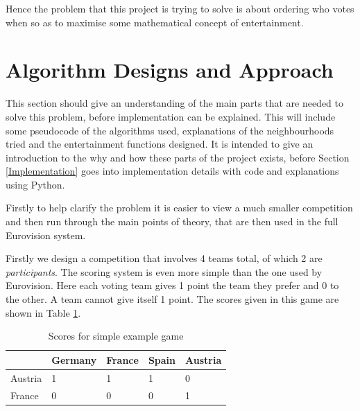 \documentclass[12pt]{report}
\begin{document}
Hence the problem that this project is trying to solve is about ordering who votes when so as to maximise some mathematical concept of entertainment.

\clearpage
\section{Algorithm Designs and Approach}\label{AlgorithmDesigns}
This section should give an understanding of the main parts that are needed to solve this problem, before implementation can be explained. This will include some pseudocode of the algorithms used, explanations of the neighbourhoods tried and the entertainment functions designed. It is intended to give an introduction to the why and how these parts of the project exists, before Section \ref{Implementation} goes into implementation details with code and explanations using Python.

Firstly to help clarify the problem it is easier to view a much smaller competition and then run through the main points of theory, that are then used in the full Eurovision system.

Firstly we design a competition that involves 4 teams total, of which 2 are \textit{participants}. The scoring system is even more simple than the one used by Eurovision. Here each voting team gives 1 point the team they prefer and 0 to the other. A team cannot give itself 1 point. The scores given in this game are shown in Table \ref{t_simpleMatrix}.

\begin{table}[H]
\centering
\caption{Scores for simple example game}
\label{t_simpleMatrix}
\begin{tabular}{|l|l|l|l|l|}
\hline
        & Germany & France & Spain & Austria \\ \hline
Austria & 1       & 1     & 1      & 0       \\ \hline
France  & 0       & 0     & 0      & 1       \\ \hline
\end{tabular}
\end{table}
\end{document}
